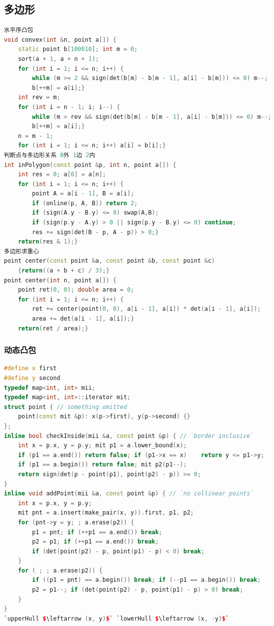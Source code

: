 \documentclass[landscape,a4paper]{article}
\begin{document}
\begin{spacing}{0.3}
\begin{multicols}{2}
\subsection{多边形}
\begin{lstlisting}[language=C++]
水平序凸包
void convex(int &n, point a[]) {
    static point b[100010]; int m = 0;
    sort(a + 1, a + n + 1);
    for (int i = 1; i <= n; i++) {
        while (m >= 2 && sign(det(b[m] - b[m - 1], a[i] - b[m])) <= 0) m--;
        b[++m] = a[i];}
    int rev = m;
    for (int i = n - 1; i; i--) {
        while (m > rev && sign(det(b[m] - b[m - 1], a[i] - b[m])) <= 0) m--;
        b[++m] = a[i];}
    n = m - 1;
    for (int i = 1; i <= n; i++) a[i] = b[i];}
判断点与多边形关系 0外 1边 2内
int inPolygon(const point &p, int n, point a[]) {
    int res = 0; a[0] = a[n];
    for (int i = 1; i <= n; i++) {
        point A = a[i - 1], B = a[i];
        if (online(p, A, B)) return 2;
        if (sign(A.y - B.y) <= 0) swap(A,B);
        if (sign(p.y - A.y) > 0 || sign(p.y - B.y) <= 0) continue;
        res += sign(det(B - p, A - p)) > 0;}
    return(res & 1);}
多边形求重心
point center(const point &a, const point &b, const point &c)
    {return((a + b + c) / 3);}
point center(int n, point a[]) {
    point ret(0, 0); double area = 0;
    for (int i = 1; i <= n; i++) {
        ret += center(point(0, 0), a[i - 1], a[i]) * det(a[i - 1], a[i]);
        area += det(a[i - 1], a[i]);}
    return(ret / area);}
\end{lstlisting}
\subsubsection{动态凸包}
\begin{lstlisting}[language=C++]
#define x first
#define y second
typedef map<int, int> mii;
typedef map<int, int>::iterator mit;
struct point { // something omitted
	point(const mit &p): x(p->first), y(p->second) {}
};
inline bool checkInside(mii &a, const point &p) { // `border inclusive`
	int x = p.x, y = p.y; mit p1 = a.lower_bound(x);
	if (p1 == a.end()) return false; if (p1->x == x)	return y <= p1->y;
	if (p1 == a.begin()) return false; mit p2(p1--);
	return sign(det(p - point(p1), point(p2) - p)) >= 0;
}
inline void addPoint(mii &a, const point &p) { // `no collinear points`
	int x = p.x, y = p.y;
	mit pnt = a.insert(make_pair(x, y)).first, p1, p2;
	for (pnt->y = y; ; a.erase(p2)) {
		p1 = pnt; if (++p1 == a.end()) break;
		p2 = p1; if (++p1 == a.end()) break;
		if (det(point(p2) - p, point(p1) - p) < 0) break;
	}
	for ( ; ; a.erase(p2)) {
		if ((p1 = pnt) == a.begin()) break; if (--p1 == a.begin()) break;
		p2 = p1--; if (det(point(p2) - p, point(p1) - p) > 0) break;
	}
}
`upperHull $\leftarrow (x, y)$` `lowerHull $\leftarrow (x, -y)$`
\end{lstlisting}

\end{multicols}
\end{spacing}
\end{document}
